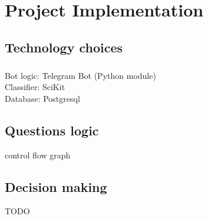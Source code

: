 \chapter{Project Implementation} %

\section{Technology choices}

\paragraph{}
Bot logic: Telegram Bot (Python module) \\
Classifier: SciKit \\
Database: Postgresql \\

\section{Questions logic}

control flow graph

\section{Decision making}

TODO
